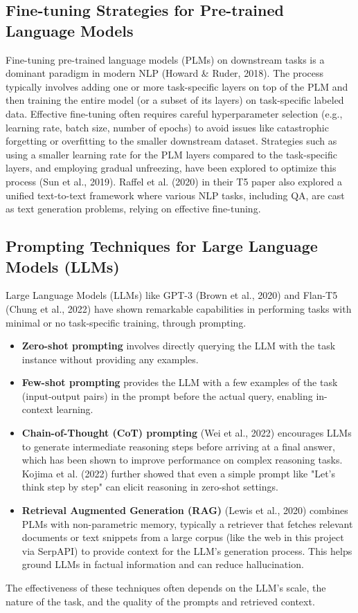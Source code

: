 \documentclass[10.5pt]{article}
\begin{document}
\subsection{Fine-tuning Strategies for Pre-trained Language Models}
Fine-tuning pre-trained language models (PLMs) on downstream tasks is a dominant paradigm in modern NLP (Howard \& Ruder, 2018). The process typically involves adding one or more task-specific layers on top of the PLM and then training the entire model (or a subset of its layers) on task-specific labeled data. Effective fine-tuning often requires careful hyperparameter selection (e.g., learning rate, batch size, number of epochs) to avoid issues like catastrophic forgetting or overfitting to the smaller downstream dataset. Strategies such as using a smaller learning rate for the PLM layers compared to the task-specific layers, and employing gradual unfreezing, have been explored to optimize this process (Sun et al., 2019). Raffel et al. (2020) in their T5 paper also explored a unified text-to-text framework where various NLP tasks, including QA, are cast as text generation problems, relying on effective fine-tuning.

\subsection{Prompting Techniques for Large Language Models (LLMs)}
Large Language Models (LLMs) like GPT-3 (Brown et al., 2020) and Flan-T5 (Chung et al., 2022) have shown remarkable capabilities in performing tasks with minimal or no task-specific training, through prompting.
\begin{itemize}
    \item \textbf{Zero-shot prompting} involves directly querying the LLM with the task instance without providing any examples.
    \item \textbf{Few-shot prompting} provides the LLM with a few examples of the task (input-output pairs) in the prompt before the actual query, enabling in-context learning.
    \item \textbf{Chain-of-Thought (CoT) prompting} (Wei et al., 2022) encourages LLMs to generate intermediate reasoning steps before arriving at a final answer, which has been shown to improve performance on complex reasoning tasks. Kojima et al. (2022) further showed that even a simple prompt like "Let's think step by step" can elicit reasoning in zero-shot settings.
    \item \textbf{Retrieval Augmented Generation (RAG)} (Lewis et al., 2020) combines PLMs with non-parametric memory, typically a retriever that fetches relevant documents or text snippets from a large corpus (like the web in this project via SerpAPI) to provide context for the LLM's generation process. This helps ground LLMs in factual information and can reduce hallucination.
\end{itemize}
The effectiveness of these techniques often depends on the LLM's scale, the nature of the task, and the quality of the prompts and retrieved context.
\end{document}
